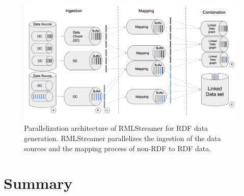 \begin{figure}[!htbp]
  \centering
  \includegraphics[width=\textwidth]{fig/rml_streamer_arch.png}
  \caption{Parallelization architecture of RMLStreamer for RDF data generation. RMLStreamer parallelizes 
  the ingestion of the data sources and the mapping process of non-RDF to RDF data. }
  \label{fig:rml-parallel-arch}
\end{figure}


\section{Summary}





